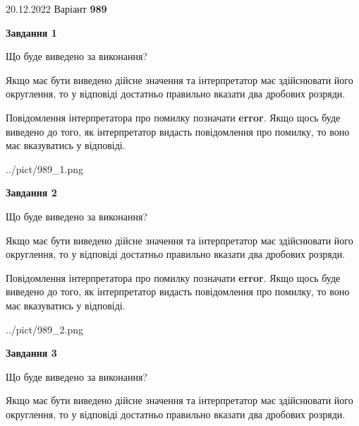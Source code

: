 \documentclass[12pt, ukrainian]{article}
\begin{document}
{20.12.2022 Варіант \No \textbf { 989 }\par}
{
\begin {Large}

{\begin {center}\textbf{Завдання 1}\end {center}}\par
Що буде виведено за виконання? \par

Якщо має бути виведено дійсне значення та інтерпретатор має здійснювати його округлення, 
то у відповіді достатньо правильно вказати два дробових розряди.

Повідомлення інтерпретатора про помилку позначати \textbf{error}.
Якщо щось буде виведено до того, як інтерпретатор видасть повідомлення про помилку, 
то воно має вказуватись у відповіді. \par

\begin{center}
	{../pict/989_1.png}
\end{center}
\newpage

{\begin {center}\textbf{Завдання 2}\end {center}}\par
Що буде виведено за виконання? \par

Якщо має бути виведено дійсне значення та інтерпретатор має здійснювати його округлення, 
то у відповіді достатньо правильно вказати два дробових розряди.

Повідомлення інтерпретатора про помилку позначати \textbf{error}.
Якщо щось буде виведено до того, як інтерпретатор видасть повідомлення про помилку, 
то воно має вказуватись у відповіді. \par

\begin{center}
	{../pict/989_2.png}
\end{center}
\newpage

{\begin {center}\textbf{Завдання 3}\end {center}}\par
Що буде виведено за виконання? \par

Якщо має бути виведено дійсне значення та інтерпретатор має здійснювати його округлення, 
то у відповіді достатньо правильно вказати два дробових розряди.


\end{Large}}
\end{document}
